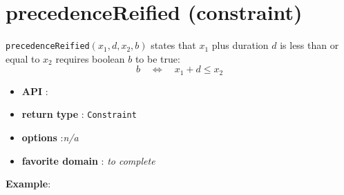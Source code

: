 \label{precedencereified}
\hypertarget{precedencereified}{}

\section{precedenceReified (constraint)}\label{precedencereified:precedencereifiedconstraint}\hypertarget{precedencereified:precedencereifiedconstraint}{}
\begin{notedef}
  \texttt{precedenceReified}$(x_1,d,x_2,b)$ states that $x_1$ plus duration $d$ is less than or equal to $x_2$ requires boolean $b$ to be true:
  $$b\quad\iff\quad x_1 + d \le x_2$$
\end{notedef}

\begin{itemize}
	\item \textbf{API} : 
	\item \textbf{return type} : \texttt{Constraint}
	\item \textbf{options} :\emph{n/a}
	\item \textbf{favorite domain} : \emph{to complete}
\end{itemize}

\textbf{Example}:

